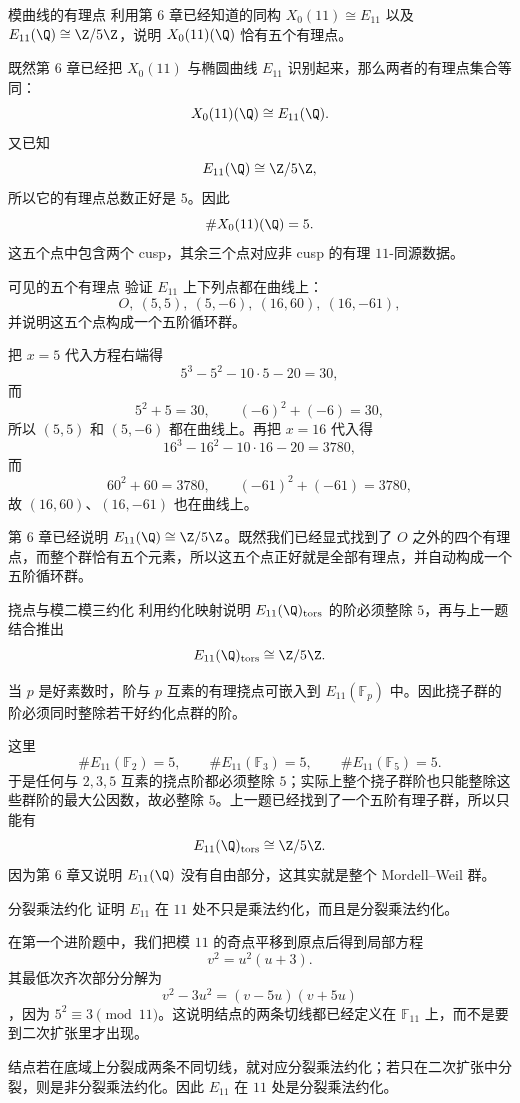 \begin{problem}{模曲线的有理点}
\hard
利用第 6 章已经知道的同构 $X_0(11)\cong E_{11}$ 以及 $E_{11}(\Q)\cong \Z/5\Z$，说明 $X_0(11)(\Q)$ 恰有五个有理点。
\end{problem}
\begin{solution}
既然第 6 章已经把 $X_0(11)$ 与椭圆曲线 $E_{11}$ 识别起来，那么两者的有理点集合等同：
\[
X_0(11)(\Q)\cong E_{11}(\Q).
\]
又已知
\[
E_{11}(\Q)\cong \Z/5\Z,
\]
所以它的有理点总数正好是 $5$。因此
\[
\#X_0(11)(\Q)=5.
\]
这五个点中包含两个 cusp，其余三个点对应非 cusp 的有理 $11$-同源数据。
\end{solution}

\begin{problem}{可见的五个有理点}
\hard
验证 $E_{11}$ 上下列点都在曲线上：
\[
O,\ (5,5),\ (5,-6),\ (16,60),\ (16,-61),
\]
并说明这五个点构成一个五阶循环群。
\end{problem}
\begin{solution}
把 $x=5$ 代入方程右端得
\[
5^3-5^2-10\cdot 5-20=30,
\]
而
\[
5^2+5=30,
\qquad
(-6)^2+(-6)=30,
\]
所以 $(5,5)$ 和 $(5,-6)$ 都在曲线上。再把 $x=16$ 代入得
\[
16^3-16^2-10\cdot16-20=3780,
\]
而
\[
60^2+60=3780,
\qquad
(-61)^2+(-61)=3780,
\]
故 $(16,60)$、$(16,-61)$ 也在曲线上。

第 6 章已经说明 $E_{11}(\Q)\cong \Z/5\Z$。既然我们已经显式找到了 $O$ 之外的四个有理点，而整个群恰有五个元素，所以这五个点正好就是全部有理点，并自动构成一个五阶循环群。
\end{solution}

\begin{problem}{挠点与模二模三约化}
\hard
利用约化映射说明 $E_{11}(\Q)_{\mathrm{tors}}$ 的阶必须整除 $5$，再与上一题结合推出
\[
E_{11}(\Q)_{\mathrm{tors}}\cong \Z/5\Z.
\]
\end{problem}
\begin{solution}
当 $p$ 是好素数时，阶与 $p$ 互素的有理挠点可嵌入到 $E_{11}(\mathbb{F}_p)$ 中。因此挠子群的阶必须同时整除若干好约化点群的阶。

这里
\[
\#E_{11}(\mathbb{F}_2)=5,
\qquad
\#E_{11}(\mathbb{F}_3)=5,
\qquad
\#E_{11}(\mathbb{F}_5)=5.
\]
于是任何与 $2,3,5$ 互素的挠点阶都必须整除 $5$；实际上整个挠子群阶也只能整除这些群阶的最大公因数，故必整除 $5$。上一题已经找到了一个五阶有理子群，所以只能有
\[
E_{11}(\Q)_{\mathrm{tors}}\cong \Z/5\Z.
\]
因为第 6 章又说明 $E_{11}(\Q)$ 没有自由部分，这其实就是整个 Mordell--Weil 群。
\end{solution}

\begin{problem}{分裂乘法约化}
\hard
证明 $E_{11}$ 在 $11$ 处不只是乘法约化，而且是分裂乘法约化。
\end{problem}
\begin{solution}
在第一个进阶题中，我们把模 $11$ 的奇点平移到原点后得到局部方程
\[
v^2=u^2(u+3).
\]
其最低次齐次部分分解为
\[
v^2-3u^2=(v-5u)(v+5u)
\]
，因为 $5^2\equiv 3\pmod{11}$。这说明结点的两条切线都已经定义在 $\mathbb{F}_{11}$ 上，而不是要到二次扩张里才出现。

结点若在底域上分裂成两条不同切线，就对应分裂乘法约化；若只在二次扩张中分裂，则是非分裂乘法约化。因此 $E_{11}$ 在 $11$ 处是分裂乘法约化。
\end{solution}

